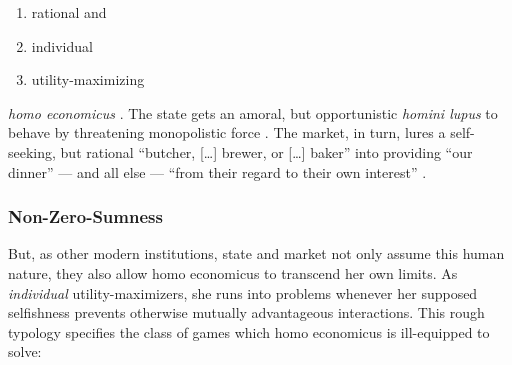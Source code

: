 \begin{enumerate}
	\item
	rational and

	\item
	individual

	\item
	utility-maximizing
\end{enumerate}
\emph{homo economicus} \citep[maybe first in][]{Mill1848}.
The state gets an amoral, but opportunistic \emph{homini lupus} to behave by threatening monopolistic force \citep[as in][]{Hobbes-1651-aa}.
The market, in turn, lures a self-seeking, but rational ``butcher, [\ldots] brewer, or [\ldots] baker'' into providing ``our dinner'' --- and all else --- ``from their regard to their own interest'' \citep{Smith-1776-lq}.

\subsubsection[Nonzero]{Non-Zero-Sumness}
	\label{sec:nonzero}
But, as other modern institutions, state and market not only assume this human nature, they also allow homo economicus to transcend her own limits.
As \emph{individual} utility-maximizers, she runs into problems whenever her supposed selfishness prevents otherwise mutually advantageous interactions.
This rough typology specifies the class of games which homo economicus is ill-equipped to solve:

